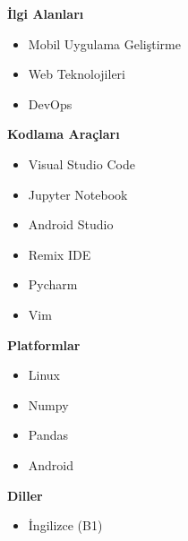 \documentclass[a4paper,11pt]{article}
\begin{document}
\vspace{0.3em}
\noindent
\begin{minipage}[t]{0.48\textwidth}
    \textbf{İlgi Alanları}
    \vspace{0.5em}
    \begin{itemize}[leftmargin=2em]
        \item Mobil Uygulama Geliştirme
		\item Web Teknolojileri
        \item DevOps
    \end{itemize}
\end{minipage}%
\hfill
\begin{minipage}[t]{0.48\textwidth}
    \textbf{Kodlama Araçları}
    \vspace{0.5em}
    \begin{itemize}[leftmargin=2em]
        \item Visual Studio Code
        \item Jupyter Notebook
        \item Android Studio
        \item Remix IDE
        \item Pycharm
        \item Vim
    \end{itemize}
\end{minipage}


\vspace{0.3em}
\noindent
\begin{minipage}[t]{0.48\textwidth}
    \textbf{Platformlar}
    \vspace{0.5em}
    \begin{itemize}[leftmargin=2em]
        \item Linux
        \item Numpy
        \item Pandas
        \item Android
    \end{itemize}
\end{minipage}%
\hfill
\begin{minipage}[t]{0.48\textwidth}
    \textbf{Diller}
    \vspace{0.5em}
    \begin{itemize}[leftmargin=2em]
        \item İngilizce (B1)
    \end{itemize}
\end{minipage}
\end{document}
